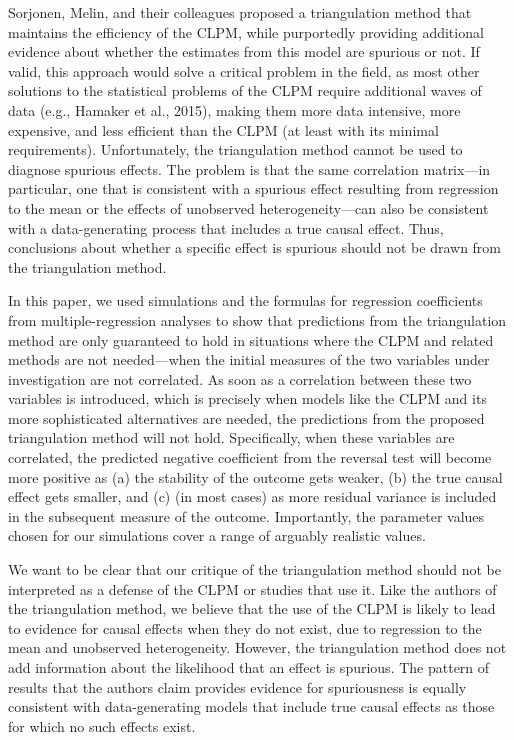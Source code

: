 \documentclass[
  man,floatsintext]{apa6}
\begin{document}
Sorjonen, Melin, and their colleagues proposed a triangulation method that maintains the efficiency of the CLPM, while purportedly providing additional evidence about whether the estimates from this model are spurious or not. If valid, this approach would solve a critical problem in the field, as most other solutions to the statistical problems of the CLPM require additional waves of data (e.g., Hamaker et al., 2015), making them more data intensive, more expensive, and less efficient than the CLPM (at least with its minimal requirements). Unfortunately, the triangulation method cannot be used to diagnose spurious effects. The problem is that the same correlation matrix---in particular, one that is consistent with a spurious effect resulting from regression to the mean or the effects of unobserved heterogeneity---can also be consistent with a data-generating process that includes a true causal effect. Thus, conclusions about whether a specific effect is spurious should not be drawn from the triangulation method.

In this paper, we used simulations and the formulas for regression coefficients from multiple-regression analyses to show that predictions from the triangulation method are only guaranteed to hold in situations where the CLPM and related methods are not needed---when the initial measures of the two variables under investigation are not correlated. As soon as a correlation between these two variables is introduced, which is precisely when models like the CLPM and its more sophisticated alternatives are needed, the predictions from the proposed triangulation method will not hold. Specifically, when these variables are correlated, the predicted negative coefficient from the reversal test will become more positive as (a) the stability of the outcome gets weaker, (b) the true causal effect gets smaller, and (c) (in most cases) as more residual variance is included in the subsequent measure of the outcome. Importantly, the parameter values chosen for our simulations cover a range of arguably realistic values.

We want to be clear that our critique of the triangulation method should not be interpreted as a defense of the CLPM or studies that use it. Like the authors of the triangulation method, we believe that the use of the CLPM is likely to lead to evidence for causal effects when they do not exist, due to regression to the mean and unobserved heterogeneity. However, the triangulation method does not add information about the likelihood that an effect is spurious. The pattern of results that the authors claim provides evidence for spuriousness is equally consistent with data-generating models that include true causal effects as those for which no such effects exist.
\end{document}
